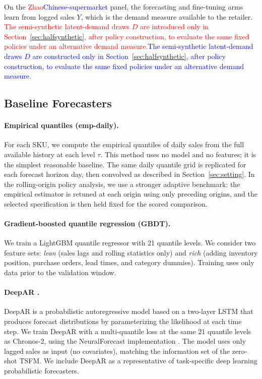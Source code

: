 \documentclass[msom,dblanonrev]{informs4}
\newcommand{\add}[1]{\textcolor{blue}{#1}}
\newcommand{\reduce}[1]{\textcolor{red}{#1}\hspace{0.5em}}
\begin{document}
On the \reduce{Zhao}\add{Chinese-supermarket} panel, the forecasting and fine-tuning arms learn from logged sales $Y$, which is the demand measure available to the retailer.
\reduce{The semi-synthetic latent-demand draws $D$ are introduced only in Section~\ref{sec:halfsynthetic}, after policy construction, to evaluate the same fixed policies under an alternative demand measure.}\add{The semi-synthetic latent-demand draws $D$ are constructed only in Section~\ref{sec:halfsynthetic}, after policy construction, to evaluate the same fixed policies under an alternative demand measure.}

\subsection{Baseline Forecasters}

\paragraph{Empirical quantiles (emp-daily).}
For each SKU, we compute the empirical quantiles of daily sales from the full available history at each level $\tau$.
This method uses no model and no features; it is the simplest reasonable baseline.
The same daily quantile grid is replicated for each forecast horizon day, then convolved as described in Section~\ref{sec:setting}.
In the rolling-origin policy analysis, we use a stronger adaptive benchmark: the empirical estimator is retuned at each origin using only preceding origins, and the selected specification is then held fixed for the scored comparison.

\paragraph{Gradient-boosted quantile regression (GBDT).}
We train a LightGBM \citep{KeEtAl2017} quantile regressor with 21 quantile levels.
We consider two feature sets: \emph{lean} (sales lags and rolling statistics only) and \emph{rich} (adding inventory position, purchase orders, lead times, and category dummies).
Training uses only data prior to the validation window.

\paragraph{DeepAR \citep{Salinas2020DeepAR}.}
DeepAR is a probabilistic autoregressive model based on a two-layer LSTM that produces forecast distributions by parameterizing the likelihood at each time step.
We train DeepAR with a multi-quantile loss at the same 21 quantile levels as Chronos-2, using the NeuralForecast implementation \citep{OlivaresEtAl2022}.
The model uses only lagged sales as input (no covariates), matching the information set of the zero-shot TSFM.
We include DeepAR as a representative of task-specific deep learning probabilistic forecasters.
\end{document}
